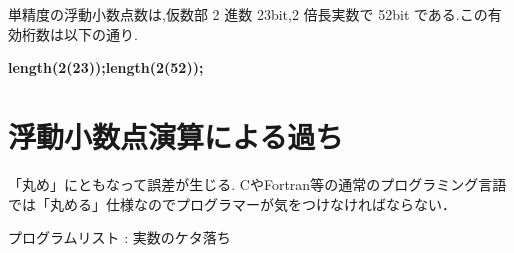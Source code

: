 \documentclass{article}
\begin{document}
\begin{maplegroup}
\begin{Maple Normal}{
単精度の浮動小数点数は,仮数部 2 進数 23bit,2 倍長実数で 52bit である.この有効桁数は以下の通り.}\end{Maple Normal}

\textbf{length(2(23));}\textbf{length(2(52));}\mapleresult
\begin{maplelatex}
\end{maplelatex}
\mapleresult
\begin{maplelatex}
\end{maplelatex}
\end{maplegroup}
\section{\textbf{浮動小数点演算による過ち}}
\begin{maplelatex}\begin{Maple Normal}{
「丸め」にともなって誤差が生じる. CやFortran等の通常のプログラミング言語では「丸める」仕様なのでプログラマーが気をつけなければならない．}\end{Maple Normal}
\end{maplelatex}
\begin{maplegroup}
\begin{Maple Normal}{
プログラムリスト : 実数のケタ落ち}\end{Maple Normal}

\end{maplegroup}
\end{document}
